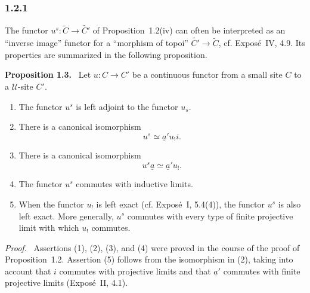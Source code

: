 \documentclass[11pt]{article}
\newcommand{\U}{\mathcal{U}}
\newenvironment{statement}[1]{\par\medskip\noindent\textbf{#1.}\ }{\par\medskip}
\newenvironment{prooftext}{\par\noindent\emph{Proof.}\ }{\par\medskip}
\begin{document}
\subsubsection*{1.2.1}
The functor \(u^s:\widetilde C\to\widetilde {C'}\) of Proposition~1.2(iv) can often be interpreted as an ``inverse image'' functor for a ``morphism of topoi'' \(\widetilde {C'}\to\widetilde C\), cf. Expos\'e~IV, 4.9. Its properties are summarized in the following proposition.

\begin{statement}{Proposition 1.3}
Let \(u:C\to C'\) be a continuous functor from a small site \(C\) to a \(\U\)-site \(C'\).
\begin{enumerate}[label=\arabic*)]
\item The functor \(u^s\) is left adjoint to the functor \(u_s\).

\item There is a canonical isomorphism
\[
u^s\simeq\underline a' u_!i.
\]

\item There is a canonical isomorphism
\[
u^s\underline a\simeq\underline a'u_!.
\]

\item The functor \(u^s\) commutes with inductive limits.

\item When the functor \(u_!\) is left exact (cf. Expos\'e~I, 5.4(4)), the functor \(u^s\) is also left exact. More generally, \(u^s\) commutes with every type of finite projective limit with which \(u_!\) commutes.
\end{enumerate}
\end{statement}

\begin{prooftext}
Assertions (1), (2), (3), and (4) were proved in the course of the proof of Proposition~1.2. Assertion (5) follows from the isomorphism in (2), taking into account that \(i\) commutes with projective limits and that \(\underline a'\) commutes with finite projective limits (Expos\'e~II, 4.1).
\end{prooftext}
\end{document}
